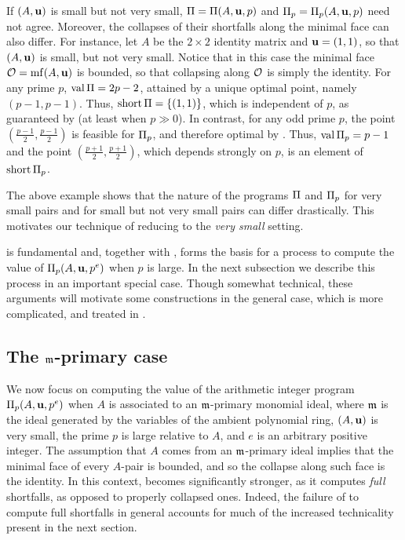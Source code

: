 \documentclass{amsart}
\begin{document}
\begin{example}
   If $(A, \mathbf{u})$ is small but not very small, $\Pi = \Pi(A,\mathbf{u},p)$ and $\Pi_p = \Pi_p(A,\mathbf{u},p)$ need not agree.
   Moreover, the collapses of their shortfalls along the minimal face can also differ.
   For instance, let $A$ be the $2 \times 2$ identity matrix and $\mathbf{u} = (1,1)$, so that $(A,\mathbf{u})$ is small, but not very small.
   Notice that in this case the minimal face $\mathcal{O} = \operatorname{mf}(A,\mathbf{u})$ is bounded, so that collapsing along $\mathcal{O}$ is simply the identity.
   For any prime $p$, $\operatorname{val} \Pi = 2p - 2$, attained by a unique optimal point, namely $(p-1,p-1)$.
   Thus, $\operatorname{short} \Pi = \{(1,1)\}$, which is independent of $p$, as guaranteed by   (at least when $p \gg 0$).
   In contrast, for any odd prime $p$, the point $(\frac{p-1}{2}, \frac{p-1}{2})$ is feasible for $\Pi_p$, and therefore optimal by .
   Thus, $\operatorname{val} \Pi_p = p-1$ and the point $(\frac{p+1}{2}, \frac{p+1}{2})$, which depends strongly on $p$, is an element of $\operatorname{short} \Pi_p$.
\end{example}

The above example shows that the nature of the programs $\Pi$ and $\Pi_p$ for very small pairs and for small but not very small pairs can differ drastically.
This motivates our technique of reducing to the \emph{very small} setting.

 is fundamental and, together with , forms the basis for a process to compute the value of $\Pi_p(A, \mathbf{u}, p^e)$ when $p$ is large.  
In the next subsection we describe this process in an important special case.  Though somewhat technical, these arguments will motivate some constructions in the general case, which is more complicated, and treated in .

\subsection{The $\mathfrak{m}$-primary case}
\label{m-primary: SS}

We now focus on computing the value of the arithmetic integer program $\Pi_p(A,\mathbf{u}, p^e)$ when $A$ is associated to an $\mathfrak{m}$-primary monomial ideal, where $\mathfrak{m}$ is the ideal generated by the variables of the ambient polynomial ring, $(A,\mathbf{u})$ is very small, the prime $p$ is large relative to $A$, and $e$ is an arbitrary positive integer.
The assumption that $A$ comes from an $\mathfrak{m}$-primary ideal implies that the minimal face of every $A$-pair is bounded, and so the collapse along such face is the identity.
In this context,  becomes significantly stronger, as it computes \emph{full} shortfalls, as opposed to properly collapsed ones.
Indeed, the failure of  to compute full shortfalls in general accounts for much of the increased technicality present in the next section.
\end{document}
